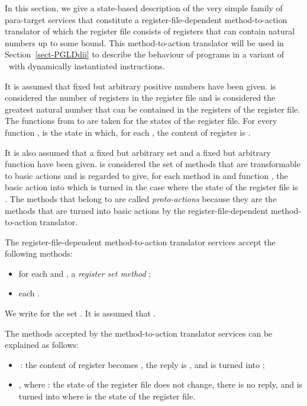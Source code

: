 \documentclass[fleqn]{llncs}
\begin{document}
In this section, we give a state-based description of the very simple
family of para-target services that constitute a register-file-dependent
method-to-action translator of which the register file consists of
registers that can contain natural numbers up to some bound.
This method-to-action translator will be used in
Section~\ref{sect-PGLDdii} to describe the behaviour of programs in a
variant of \PGLD\ with dynamically instantiated instructions.

It is assumed that fixed but arbitrary positive numbers
 have been given.
 is considered the number of registers in the register file and
 is considered the greatest natural number that can be contained
in the registers of the register file.
The functions from  to  are taken for the states
of the register file.
For every function ,  is the state
in which, for each , the content of register  is
.

It is also assumed that a fixed but arbitrary set
 and a fixed but arbitrary function
 have
been given.
 is considered the set of methods that are transformable to basic
actions and  is regarded to give, for each method  in 
and function , the basic action into
which  is turned in the case where the state of the register file is
.
The methods that belong to  are called \emph{proto-actions}
because they are the methods that are turned into basic actions by the
register-file-dependent method-to-action translator.

The register-file-dependent method-to-action translator services accept
the following methods:
\begin{itemize}
\item
for each  and ,
a \emph{register set method} ;
\item
each .
\end{itemize}
We write  for the set
.
It is assumed that .

The methods accepted by the method-to-action translator services can be
explained as follows:
\begin{itemize}
\item
\,:
the content of register  becomes , the reply is , and
 is turned into ;
\item
, where :
the state of the register file does not change, there is no reply, and
 is turned into  where  is the state of the register
file.
\end{itemize}
\end{document}
